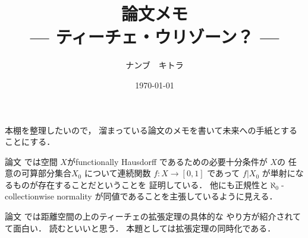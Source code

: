 \documentclass[leqno, a4paper, 12pt]{jsarticle}
\title{論文メモ
\large{\\--- ティーチェ・ウリゾーン？ ---}
}
\author{ナンブ　キトラ}
\date{\today}
\begin{document}
\maketitle

本棚を整理したいので，
溜まっている論文のメモを書いて未来への手紙とすることにする．


論文
\cite{MR0293605}
では空間
$X$がfunctionally Hausdorff 
であるための必要十分条件が
$X$の
任意の可算部分集合$X_{0}$
について連続関数
$f\colon X\to [0, 1]$
であって
$f|X_{0}$
が単射になるものが存在することだということを
証明している．
他にも正規性と$\aleph_{0}$-collectionwise normality
が同値であることを主張しているように見える．

論文
\cite{MR4431927}
では距離空間の上のティーチェの拡張定理の具体的な
やり方が紹介されてて面白い．
読むといいと思う．
本題としては拡張定理の同時化である．

\nocite{*}


\end{document}
